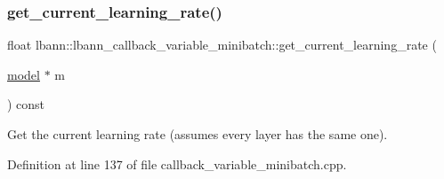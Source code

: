 \subsubsection{\texorpdfstring{get\+\_\+current\+\_\+learning\+\_\+rate()}{get\_current\_learning\_rate()}}
{\footnotesize\ttfamily float lbann\+::lbann\+\_\+callback\+\_\+variable\+\_\+minibatch\+::get\+\_\+current\+\_\+learning\+\_\+rate (\begin{DoxyParamCaption}\item[{\hyperlink{classlbann_1_1model}{model} $\ast$}]{m }\end{DoxyParamCaption}) const\hspace{0.3cm}{\ttfamily [protected]}}



Get the current learning rate (assumes every layer has the same one). 



Definition at line 137 of file callback\+\_\+variable\+\_\+minibatch.\+cpp.


